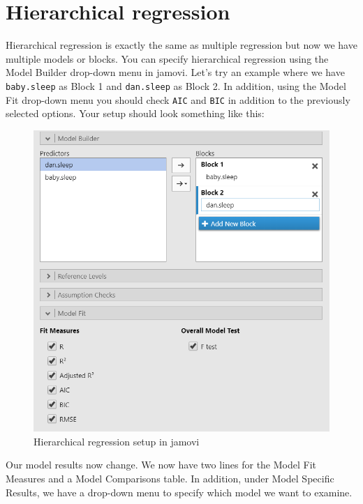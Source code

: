 \documentclass[
]{book}
\begin{document}
\hypertarget{hierarchical-regression}{%
\section{Hierarchical regression}\label{hierarchical-regression}}

Hierarchical regression is exactly the same as multiple regression but now we have multiple models or blocks. You can specify hierarchical regression using the Model Builder drop-down menu in jamovi. Let's try an example where we have \texttt{baby.sleep} as Block 1 and \texttt{dan.sleep} as Block 2. In addition, using the Model Fit drop-down menu you should check \texttt{AIC} and \texttt{BIC} in addition to the previously selected options. Your setup should look something like this:

\begin{figure}

{\centering \includegraphics[width=1\linewidth]{images/13-regression/hierarchical-setup} 

}

\caption{Hierarchical regression setup in jamovi}\label{fig:unnamed-chunk-12}
\end{figure}

Our model results now change. We now have two lines for the Model Fit Measures and a Model Comparisons table. In addition, under Model Specific Results, we have a drop-down menu to specify which model we want to examine.
\end{document}
